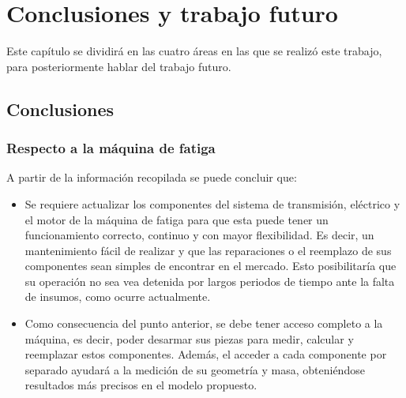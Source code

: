 \chapter{Conclusiones y trabajo futuro}

Este capítulo se dividirá en las cuatro áreas en las que se realizó este trabajo, para posteriormente hablar del trabajo futuro. 

\section{Conclusiones}

\subsection{Respecto a la máquina de fatiga}

A partir de la información recopilada se puede concluir que:
\begin{itemize}
	\item Se requiere actualizar los componentes del sistema de transmisión, eléctrico y el motor de la máquina de fatiga para que esta puede tener un funcionamiento correcto, continuo y con mayor flexibilidad. Es decir, un mantenimiento fácil de realizar y que las reparaciones o el reemplazo de sus componentes sean simples de encontrar en el mercado. Esto posibilitaría que su operación no sea vea detenida por largos periodos de tiempo ante la falta de insumos, como ocurre actualmente.
	\item Como consecuencia del punto anterior, se debe tener acceso completo a la máquina, es decir, poder desarmar sus piezas para medir, calcular y reemplazar estos componentes. Además, el acceder a cada componente por separado ayudará a la medición de su geometría y masa, obteniéndose resultados más precisos en el modelo propuesto.
\end{itemize}

\newpage

